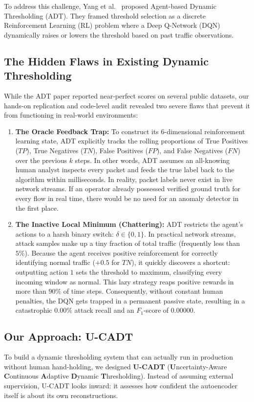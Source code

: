 \documentclass[conference]{IEEEtran}
\begin{document}
To address this challenge, Yang et al.~\cite{yang2023adt} proposed Agent-based Dynamic Thresholding (ADT). They framed threshold selection as a discrete Reinforcement Learning (RL) problem where a Deep Q-Network (DQN) dynamically raises or lowers the threshold based on past traffic observations.

\subsection{The Hidden Flaws in Existing Dynamic Thresholding}
While the ADT paper reported near-perfect scores on several public datasets, our hands-on replication and code-level audit revealed two severe flaws that prevent it from functioning in real-world environments:

\begin{enumerate}
    \item \textbf{The Oracle Feedback Trap:} To construct its 6-dimensional reinforcement learning state, ADT explicitly tracks the rolling proportions of True Positives ($TP$), True Negatives ($TN$), False Positives ($FP$), and False Negatives ($FN$) over the previous $k$ steps. In other words, ADT assumes an all-knowing human analyst inspects every packet and feeds the true label back to the algorithm within milliseconds. In reality, packet labels never exist in live network streams. If an operator already possessed verified ground truth for every flow in real time, there would be no need for an anomaly detector in the first place.
    \item \textbf{The Inactive Local Minimum (Chattering):} ADT restricts the agent's actions to a harsh binary switch: $\delta \in \{0, 1\}$. In practical network streams, attack samples make up a tiny fraction of total traffic (frequently less than $5\%$). Because the agent receives positive reinforcement for correctly identifying normal traffic ($+0.5$ for $TN$), it quickly discovers a shortcut: outputting action $1$ sets the threshold to maximum, classifying every incoming window as normal. This lazy strategy reaps positive rewards in more than $90\%$ of time steps. Consequently, without constant human penalties, the DQN gets trapped in a permanent passive state, resulting in a catastrophic $0.00\%$ attack recall and an $F_1$-score of $0.00000$.
\end{enumerate}

\subsection{Our Approach: U-CADT}
To build a dynamic thresholding system that can actually run in production without human hand-holding, we designed \textbf{U-CADT} (\textbf{U}ncertainty-Aware \textbf{C}ontinuous \textbf{A}daptive \textbf{D}ynamic \textbf{T}hresholding). Instead of assuming external supervision, U-CADT looks inward: it assesses how confident the autoencoder itself is about its own reconstructions.
\end{document}
